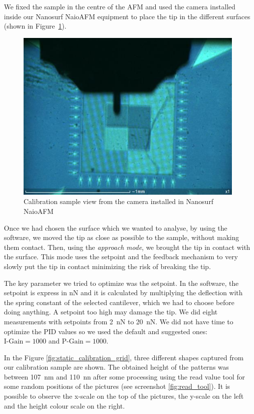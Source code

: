 \documentclass[11pt,a4paper]{article}
\begin{document}
We fixed the sample in the centre of the AFM and used the camera installed inside our Nanosurf NaioAFM equipment to place the tip in the different surfaces (shown in Figure~\ref{fig:cal_sam}).

\begin{figure}[ht]
\centering
\includegraphics[scale=0.4]{calibration_sample}
\caption{Calibration sample view from the camera installed in Nanosurf NaioAFM}
\label{fig:cal_sam}
\end{figure}

Once we had chosen the surface which we wanted to analyse, by using the software, we moved the tip as close as possible to the sample, without making them contact. Then, using the \emph{approach mode}, we brought the tip in contact with the surface. This mode uses the setpoint and the feedback mechanism to very slowly put the tip in contact minimizing the risk of breaking the tip.

The key parameter we tried to optimize was the setpoint. In the software, the setpoint is express in \si{\nano N} and it is calculated by multiplying the deflection with the spring constant of the selected cantilever, which we had to choose before doing anything. A setpoint too high may damage the tip. We did eight measurements with setpoints from \SI{2}{\nano N} to \SI{20}{\nano N}. We did not have time to optimize the PID values so we used the default and suggested ones: $\text{I-Gain}=1000$ and $\text{P-Gain}=1000$.

In the Figure \ref{fig:static_calibration_grid}, three different shapes captured from our calibration sample are shown. The obtained height of the patterns was between \SI{107}{\nano m} and \SI{110}{\nano n} after some processing using the read value tool for some random positions of the pictures (see screenshot \ref{fig:read_tool}). It is possible to observe the x-scale on the top of the pictures, the y-scale on the left and the height colour scale on the right.
\end{document}
